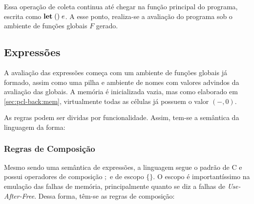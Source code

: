 Essa operação de coleta continua até chegar na função principal do programa, escrita como $\mathbf{let}\;()\; e$. A esse ponto, realiza-se a avaliação do programa sob o ambiente de funções globais $F$ gerado. 

\subsection{Expressões}

A avaliação das expressões começa com um ambiente de funções globais já formado, assim como uma pilha e ambiente de nomes com valores advindos da avaliação das globais. A memória é inicializada vazia, mas como elaborado em \ref{sec:pcl-back:mem}, virtualmente todas as células já possuem o valor $(-, 0)$. 

As regras podem ser dividas por funcionalidade. Assim, tem-se a semântica da linguagem da forma:

\subsubsection{Regras de Composição}

Mesmo sendo uma semântica de expressões, a linguagem segue o padrão de C e possui operadores de composição $;$ e de escopo $\{\}$. O escopo é importantíssimo na emulação das falhas de memória, principalmente quanto se diz a falhas de \emph{Use-After-Free}. Dessa forma, têm-se as regras de composição:






